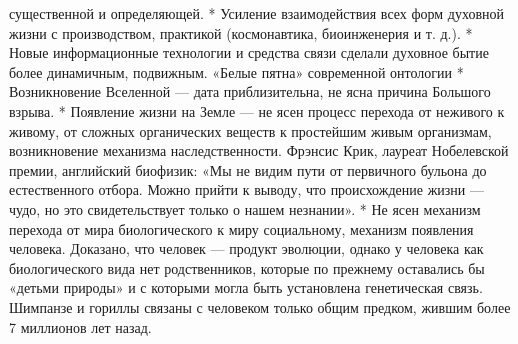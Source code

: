 \documentclass[12pt]{article}
\begin{document}
существенной и определяющей.
    *  Усиление  взаимодействия  всех  форм  духовной  жизни  с  производством,  практикой  (космонавтика,
биоинженерия и т. д.).
    *  Новые  информационные  технологии  и  средства  связи  сделали  духовное  бытие  более  динамичным,
подвижным.
«Белые пятна» современной онтологии
* Возникновение Вселенной — дата приблизительна, не ясна причина Большого взрыва.
* Появление жизни на Земле — не ясен процесс перехода от неживого к живому, от сложных органических
веществ к простейшим живым организмам, возникновение механизма наследственности.
Фрэнсис Крик, лауреат Нобелевской премии, английский биофизик: «Мы не видим пути от первичного бульона
до естественного отбора. Можно прийти к выводу, что происхождение жизни — чудо, но это свидетельствует
только о нашем незнании».
 * Не ясен механизм перехода от мира биологического к миру социальному, механизм появления человека.
Доказано, что человек — продукт эволюции, однако у человека как биологического вида нет родственников,
которые по прежнему оставались бы «детьми природы» и с которыми могла быть установлена генетическая
связь. Шимпанзе и гориллы связаны с человеком только общим предком, жившим более 7 миллионов лет назад.

\newpage
\end{document}
